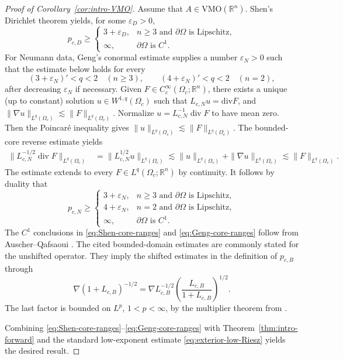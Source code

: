 \documentclass[12pt]{amsart}
\newcommand\R{\mathbb{R}}
\newcommand{\diver}{\operatorname{div}}
\theoremstyle{remark}
\begin{document}
\begin{proof}[Proof of Corollary~\ref{cor:intro-VMO}]
Assume that $A\in\mathrm{VMO}(\R^n)$.    Shen's Dirichlet theorem \cite[Theorem~C]{Shen05} yields, for some
$\varepsilon_D>0$,
\begin{equation}\label{eq:Shen-core-ranges}
 p_{c,D}\geq
 \begin{cases}
  3+\varepsilon_D,
     &n\geq3\text{ and }\partial\Omega\text{ is Lipschitz},\\
  \infty,
     &\partial\Omega\text{ is }C^1.
 \end{cases}
\end{equation}
For Neumann data, Geng's conormal estimate
\cite[Theorem~1.2]{Geng12} supplies a number $\varepsilon_N>0$ such that the estimate below holds for every
\[
 (3+\varepsilon_N)'<q<2\quad(n\geq3),
 \qquad
 (4+\varepsilon_N)'<q<2\quad(n=2),
\]
after decreasing $\varepsilon_N$ if necessary.  Given
\(F\in C_c^\infty(\Omega_c;\R^n)\), there exists a unique (up to constant) solution $u\in W^{1,q}(\Omega_c)$ such that $L_{c,N}u = \textrm{div} F$, and $\| \nabla u\|_{L^q(\Omega_c)} \lesssim \|F\|_{L^q(\Omega_c)}$. Normalize $u=L_{c,N}^{-1}\diver F$ to have mean zero. Then the Poincar\'e inequality gives $\|u\|_{L^q(\Omega_c)}\lesssim \|F\|_{L^q(\Omega_c)}$. The bounded-core reverse estimate \cite[Theorem~1]{AuscherTchamitchian01} yields
\[
 \begin{aligned}
 \|L_{c,N}^{-1/2}\diver F\|_{L^q(\Omega_c)}
 &=\|L_{c,N}^{1/2}u\|_{L^q(\Omega_c)}\lesssim\|u\|_{L^q(\Omega_c)}+\|\nabla u\|_{L^q(\Omega_c)}
 \lesssim\|F\|_{L^q(\Omega_c)}.
 \end{aligned}
\]
The estimate extends to every \(F\in L^q(\Omega_c;\R^n)\) by continuity. It follows by duality that 
\begin{equation}\label{eq:Geng-core-ranges}
 p_{c,N}\geq
 \begin{cases}
  3+\varepsilon_N,
     &n\geq3\text{ and }\partial\Omega\text{ is Lipschitz},\\
  4+\varepsilon_N,
     &n=2\text{ and }\partial\Omega\text{ is Lipschitz},\\
  \infty,
     &\partial\Omega\text{ is }C^1.
 \end{cases}
\end{equation}
The $C^1$ conclusions in \eqref{eq:Shen-core-ranges} and
\eqref{eq:Geng-core-ranges} follow from Auscher--Qafsaoui \cite{AuscherQafsaoui}. The cited bounded-domain estimates are commonly stated for the unshifted
operator.  They imply the shifted estimates in the definition of \(p_{c,B}\) through
\[
 \nabla(1+L_{c,B})^{-1/2}
 =
 \nabla L_{c,B}^{-1/2}
 \left(\frac{L_{c,B}}{1+L_{c,B}}\right)^{1/2}.
\]
The last factor is bounded on $L^p$, $1<p<\infty$, by the multiplier theorem from \cite{Stein70}.

Combining \eqref{eq:Shen-core-ranges}--\eqref{eq:Geng-core-ranges} with Theorem~\ref{thm:intro-forward} and the standard low-exponent estimate \eqref{eq:exterior-low-Riesz} yields the desired result.

\end{proof}
\end{document}
